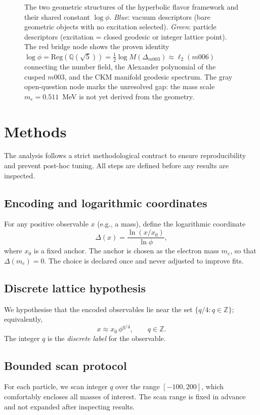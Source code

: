 ﻿\documentclass[12pt]{article}
\theoremstyle{definition}
\begin{document}
\begin{figure}[htbp]
\centering
%
\caption{The two geometric structures of the hyperbolic flavor framework
and their shared constant $\log\phi$. \textit{Blue}: vacuum descriptors
(bare geometric objects with no excitation selected).
\textit{Green}: particle descriptors (excitation = closed geodesic or
integer lattice point). The red bridge node shows the proven identity
$\log\phi = \mathrm{Reg}(\mathbb{Q}(\sqrt5)) = \tfrac{1}{2}\log
M(\Delta_{m003}) \approx \ell_2(m006)$ connecting the number field,
the Alexander polynomial of the cusped $m003$, and the CKM manifold
geodesic spectrum. The gray open-question node marks the unresolved
gap: the mass scale $m_e = 0.511$~MeV is not yet derived from the
geometry.}
\label{fig:two_structures}
\end{figure}

\section{Methods}
\label{sec:methods}

The analysis follows a strict methodological contract to ensure reproducibility and prevent post-hoc tuning. All steps are defined before any results are inspected.

\subsection{Encoding and logarithmic coordinates}
For any positive observable $x$ (e.g., a mass), define the logarithmic coordinate
\[
\Delta(x) = \frac{\ln(x/x_0)}{\ln\phi},
\]
where $x_0$ is a fixed anchor. The anchor is chosen as the electron mass $m_e$, so that $\Delta(m_e)=0$. The choice is declared once and never adjusted to improve fits.

\subsection{Discrete lattice hypothesis}
We hypothesise that the encoded observables lie near the set $\{q/4 : q\in\mathbb{Z}\}$; equivalently,
\[
x \approx x_0 \,\phi^{q/4},\qquad q\in\mathbb{Z}.
\]
The integer $q$ is the \emph{discrete label} for the observable.

\subsection{Bounded scan protocol}
For each particle, we scan integer $q$ over the range $[-100,200]$, which comfortably encloses all masses of interest. The scan range is fixed in advance and not expanded after inspecting results.
\end{document}
